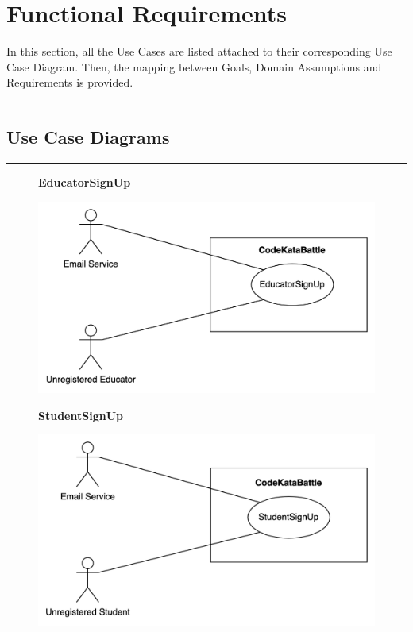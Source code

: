 \documentclass{Configuration_Files/Template}
\begin{document}
\section{Functional Requirements}

In this section, all the Use Cases are listed attached to their corresponding Use Case Diagram. Then, the mapping between Goals, Domain Assumptions and Requirements is provided.\\
{\color{bluepoli}\rule{\linewidth}{0.1pt}}

\subsection{Use Case Diagrams}

{\color{bluepoli}\rule{\linewidth}{0.1pt}}

\begin{figure}[H]
\textbf{EducatorSignUp}\par\medskip
\includegraphics[scale = 0.45]{Images/UseCaseDiagrams/EducatorSignUpUseCaseDiagram.png}\\
\centering
\end{figure}
\begin{figure}[H]
\textbf{StudentSignUp}\par\medskip
\includegraphics[scale = 0.45]{Images/UseCaseDiagrams/StudentSignUpUseCaseDiagram.png}\\
\centering
\end{figure}
\end{document}
